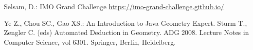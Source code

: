 \documentclass[runningheads]{llncs}
\begin{document}
\begin{thebibliography}
  Selsam, D.: IMO Grand Challenge
  \newblock \url{https://imo-grand-challenge.github.io/}

  Ye Z., Chou SC., Gao XS.: An Introduction to Java Geometry Expert.
  \newblock Sturm T., Zengler C. (eds) Automated Deduction in
  Geometry. ADG 2008.
  \newblock Lecture Notes in Computer Science, vol 6301. Springer, Berlin, Heidelberg.
  

  \end{thebibliography}
\end{document}
